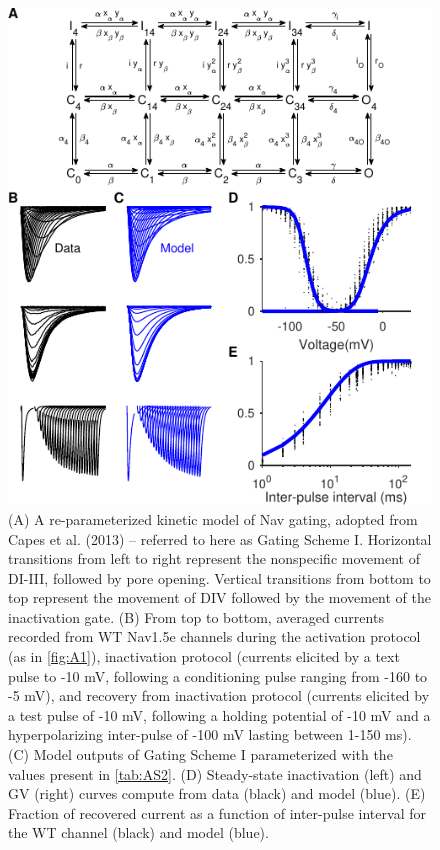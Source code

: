 \begin{figure}[t]
\begin{minipage}[c]{85mm}
    \includegraphics[width=\textwidth]{Figures/AppendixA/figure02.pdf}
\end{minipage}\hfill
\begin{minipage}[c]{80mm}
    \caption{
    (A) A re-parameterized kinetic model of Nav gating, adopted from Capes et al. (2013) -- referred to here as Gating Scheme I. Horizontal transitions from left to right represent the nonspecific movement of DI-III, followed by pore opening. Vertical transitions from bottom to top represent the movement of DIV followed by the movement of the inactivation gate.
    (B) From top to bottom, averaged currents recorded from WT Nav1.5e channels during the activation protocol (as in \autoref{fig:A1}), inactivation protocol (currents elicited by a text pulse to -10 mV, following a conditioning pulse ranging from -160 to -5 mV), and recovery from inactivation protocol (currents elicited by a test pulse of -10 mV, following a holding potential of -10 mV and a hyperpolarizing inter-pulse of -100 mV lasting between 1-150 ms). 
    (C) Model outputs of Gating Scheme I parameterized with the values present in \autoref{tab:AS2}.
    (D) Steady-state inactivation (left) and GV (right) curves compute from data (black) and model (blue).
    (E) Fraction of recovered current as a function of inter-pulse interval for the WT channel (black) and model (blue).}
    \label{fig:A2}
\end{minipage}
\end{figure}


